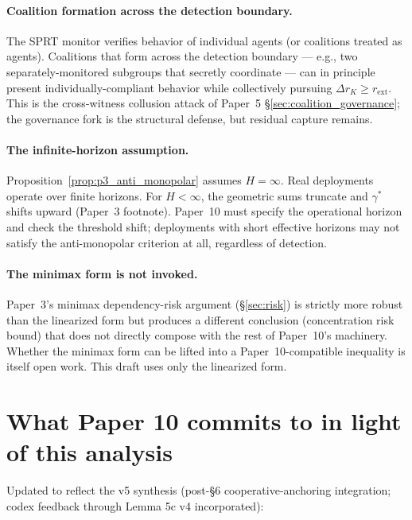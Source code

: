 \documentclass{article}
\newcommand{\rext}{r_{\mathrm{ext}}}
\begin{document}
\paragraph{Coalition formation across the detection boundary.}
The SPRT monitor verifies behavior of individual agents (or coalitions
treated as agents).  Coalitions that form across the detection boundary
--- e.g., two separately-monitored subgroups that secretly coordinate ---
can in principle present individually-compliant behavior while
collectively pursuing $\Delta r_K \geq \rext$.  This is the cross-witness
collusion attack of Paper~5 \S\ref{sec:coalition_governance}; the
governance fork is the structural defense, but residual capture remains.

\paragraph{The infinite-horizon assumption.}
Proposition~\ref{prop:p3_anti_monopolar} assumes $H = \infty$.  Real
deployments operate over finite horizons.  For $H < \infty$, the
geometric sums truncate and $\gamma^*$ shifts upward (Paper~3 footnote).
Paper~10 must specify the operational horizon and check the threshold
shift; deployments with short effective horizons may not satisfy the
anti-monopolar criterion at all, regardless of detection.

\paragraph{The minimax form is not invoked.}
Paper~3's minimax dependency-risk argument (\S\ref{sec:risk}) is
strictly more robust than the linearized form but produces a different
conclusion (concentration risk bound) that does not directly compose
with the rest of Paper~10's machinery.  Whether the minimax form can
be lifted into a Paper~10-compatible inequality is itself open work.
This draft uses only the linearized form.

\section{What Paper 10 commits to in light of this analysis}

Updated to reflect the v5 synthesis (post-\S6 cooperative-anchoring
integration; codex feedback through Lemma 5c v4 incorporated):
\end{document}
